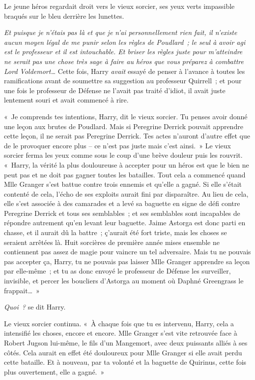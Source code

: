 Le jeune héros regardait droit vers le vieux sorcier, ses yeux verts impassible braqués sur le bleu derrière les lunettes.

\emph{Et puisque je n'étais pas là et que je n'ai personnellement rien fait, il n'existe aucun moyen légal de me punir selon les règles de Poudlard~; le seul à avoir agi est le professeur et il est intouchable. Et briser les règles juste pour m'atteindre ne serait pas une chose très sage à faire au héros que vous préparez à combattre Lord Voldemort…} Cette fois, Harry \emph{avait} essayé de penser à l'avance à toutes les ramifications avant de soumettre sa suggestion au professeur Quirrell~; et pour une fois le professeur de Défense ne l'avait pas traité d'idiot, il avait juste lentement souri et avait commencé à rire.

«~Je comprends tes intentions, Harry, dit le vieux sorcier. Tu penses avoir donné une leçon aux brutes de Poudlard. Mais si Peregrine Derrick pouvait apprendre cette leçon, il ne serait pas Peregrine Derrick. Tes actes n'auront d'autre effet que de le provoquer encore plus -- ce n'est pas juste mais c'est ainsi.~» Le vieux sorcier ferma les yeux comme sous le coup d'une brève douleur puis les rouvrit. «~Harry, la vérité la plus douloureuse à accepter pour un héros est que le bien ne peut pas et ne doit pas gagner toutes les batailles. Tout cela a commencé quand Mlle Granger s'est battue contre trois ennemis et qu'elle a gagné. Si elle s'était contenté de cela, l'écho de ses exploits aurait fini par disparaître. Au lieu de cela, elle s'est associée à des camarades et a levé sa baguette en signe de défi contre Peregrine Derrick et tous ses semblables~; et ses semblables sont incapables de répondre autrement qu'en levant leur baguette. Jaime Astorga est donc parti en chasse, et il aurait dû la battre~; ç'aurait été fort triste, mais les choses se seraient arrêtées là. Huit sorcières de première année mises ensemble ne contiennent pas assez de magie pour vaincre un tel adversaire. Mais tu ne pouvais pas accepter ça, Harry, tu ne pouvais pas laisser Mlle Granger apprendre sa leçon par elle-même~; et tu as donc envoyé le professeur de Défense les surveiller, invisible, et percer les boucliers d'Astorga au moment où Daphné Greengrass le frappait…~»

\emph{Quoi~?} se dit Harry.

Le vieux sorcier continua. «~À chaque fois que tu es intervenu, Harry, cela a intensifié les choses, encore et encore. Mlle Granger s'est vite retrouvée face à Robert Jugson lui-même, le fils d'un Mangemort, avec deux puissants alliés à ses côtés. Cela aurait en effet été douloureux pour Mlle Granger si elle avait perdu cette bataille. Et à nouveau, par ta volonté et la baguette de Quirinus, cette fois plus ouvertement, elle a gagné.~»


